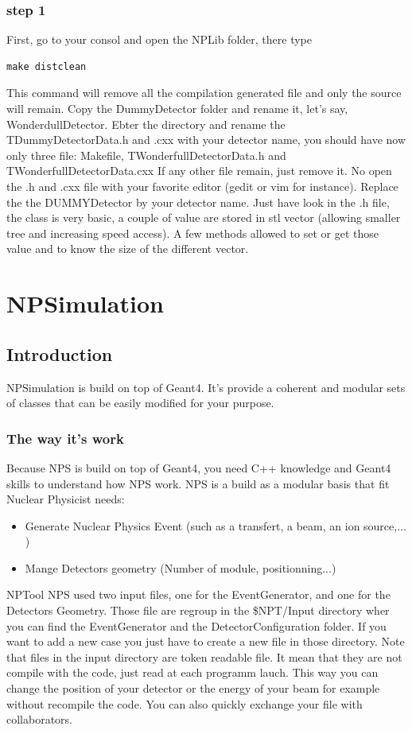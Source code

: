 \documentclass{book}
\begin{document}
		\subsection{step 1}
			First, go to your consol and open the NPLib folder, there type \begin{verbatim}make distclean\end{verbatim}
			This command will remove all the compilation generated file and only the source will remain.
			Copy the DummyDetector folder and rename it, let's say, WonderdullDetector. 
			Ebter the directory and rename the TDummyDetectorData.h and .cxx with your detector name, you should have now only three file: Makefile, TWonderfullDetectorData.h and TWonderfullDetectorData.cxx
			If any other file remain, just remove it.
			No open the .h and .cxx file with your favorite editor (gedit or vim for instance). Replace the the DUMMYDetector by your detector name. Just have look in the .h file, the class is very basic, a couple of value are stored in stl vector (allowing smaller tree and increasing speed access). A few methods allowed to set or get those value and to know the size of the different vector. 
				
\chapter[NPSimulation]{NPSimulation}

\section{Introduction}

NPSimulation is build on top of Geant4. 
It's provide a coherent and modular sets of classes that can be easily modified for your purpose.

\subsection{ The way it's work }

Because NPS is build on top of Geant4, you need C++ knowledge and Geant4 skills to understand how NPS work. 
NPS is a build as a modular basis that fit Nuclear Physicist needs: 
	\begin{itemize}
		\item Generate Nuclear Physics Event (such as a transfert, a beam, an ion source,... ) 
		\item Mange Detectors geometry (Number of module, positionning...)
	\end{itemize}
NPTool
NPS used two input files, one for the EventGenerator, and one for the Detectors Geometry. 
Those file are regroup in the \$NPT/Input directory wher you can find the EventGenerator and the DetectorConfiguration folder. 
If you want to add a new case you just have to create a new file in those directory. 
Note that files in the input directory are token readable file. It mean that they are not compile with the code, just read at each programm lauch. 
This way you can change the position of your detector or the energy of your beam for example without recompile the code. 
You can also quickly exchange your file with collaborators.
\end{document}
